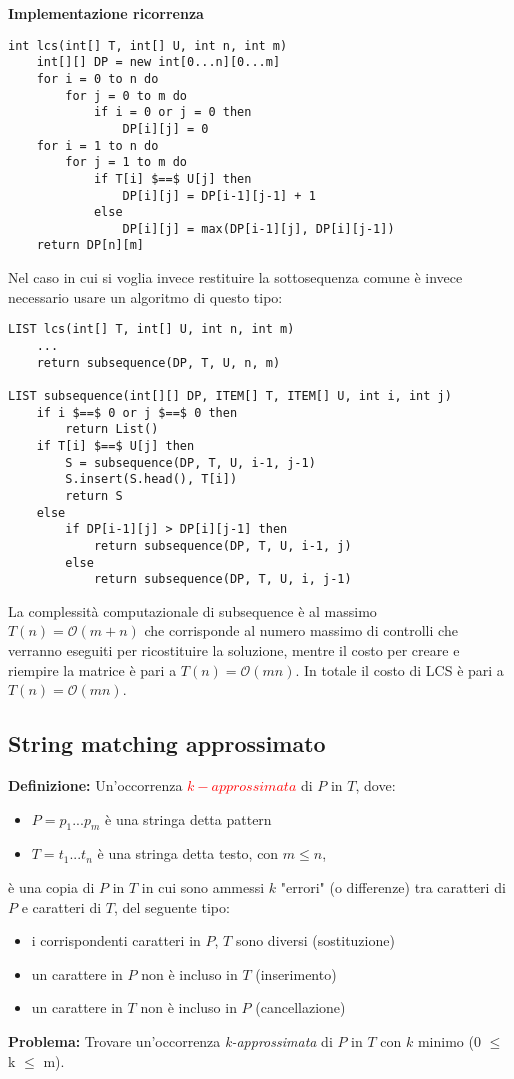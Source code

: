 \documentclass[../cheatSheetAlgoritmi.tex]{subfiles}
\begin{document}
\textbf{Implementazione ricorrenza}
\begin{lstlisting}[caption= Lunghezza LCS]
int lcs(int[] T, int[] U, int n, int m)
	int[][] DP = new int[0...n][0...m]
	for i = 0 to n do
		for j = 0 to m do
			if i = 0 or j = 0 then
				DP[i][j] = 0
	for i = 1 to n do
		for j = 1 to m do
			if T[i] $==$ U[j] then
				DP[i][j] = DP[i-1][j-1] + 1
			else
				DP[i][j] = max(DP[i-1][j], DP[i][j-1])
	return DP[n][m]
\end{lstlisting}
\begin{flushleft}
Nel caso in cui si voglia invece restituire la sottosequenza comune è invece necessario usare un algoritmo di questo tipo:
\end{flushleft}
\begin{lstlisting}[caption=Ricostruire LCS]
LIST lcs(int[] T, int[] U, int n, int m)
	...
	return subsequence(DP, T, U, n, m)
	
LIST subsequence(int[][] DP, ITEM[] T, ITEM[] U, int i, int j)
	if i $==$ 0 or j $==$ 0 then
		return List()
	if T[i] $==$ U[j] then
		S = subsequence(DP, T, U, i-1, j-1)
		S.insert(S.head(), T[i])
		return S
	else
		if DP[i-1][j] > DP[i][j-1] then
			return subsequence(DP, T, U, i-1, j)
		else
			return subsequence(DP, T, U, i, j-1)
\end{lstlisting}
La complessità computazionale di subsequence è al massimo $T(n) = \mathcal{O}(m+n)$ che  corrisponde al numero massimo di controlli che verranno eseguiti per ricostituire la soluzione, mentre il costo per creare e riempire la matrice è pari a $T(n) = \mathcal{O}(mn)$. In totale il costo di LCS è pari a $T(n) = \mathcal{O}(mn)$.

\subsection{String matching approssimato}
\textbf{Definizione:} Un'occorrenza \textcolor{red}{$k-approssimata$} di $P$ in $T$, dove: 
\begin{itemize}
	\item $P = p_{1}...p_{m}$ è una stringa detta pattern
	\item $T = t_{1}...t_{n}$ è una stringa detta testo, con $m \leq n$,
\end{itemize}
è una copia di $P$ in $T$ in cui sono ammessi $k$ "errori" (o differenze) tra caratteri di $P$ e caratteri di $T$, del seguente tipo:
\begin{itemize}
	\item i corrispondenti caratteri in $P$, $T$ sono diversi (sostituzione) 
	\item un carattere in $P$ non è incluso in $T$ (inserimento)
	\item un carattere in $T$ non è incluso in $P$ (cancellazione)
\end{itemize}
\textbf{Problema:} Trovare un'occorrenza \emph{k-approssimata} di $P$ in $T$ con $k$ minimo (0 $\leq$ k $\leq$ m).
\end{document}
